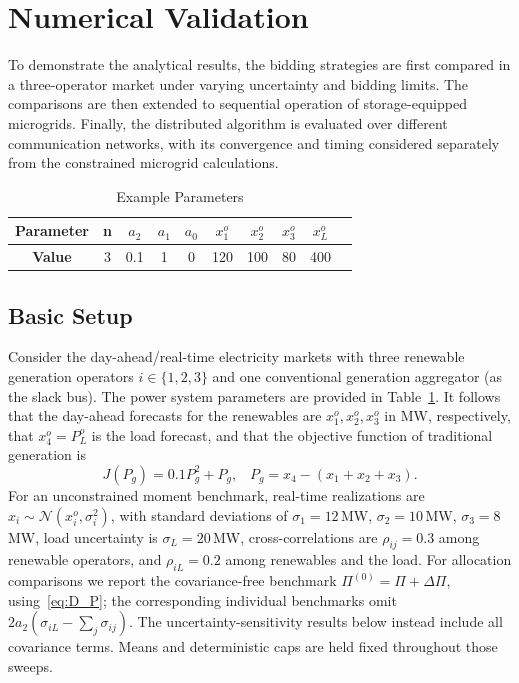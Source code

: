 \documentclass[journal]{IEEEtran}
\begin{document}
\section{Numerical Validation \label{sec:examples}}

To demonstrate the analytical results, the bidding strategies are first compared in a three-operator market under varying uncertainty and bidding limits. The comparisons are then extended to sequential operation of storage-equipped microgrids. Finally, the distributed algorithm is evaluated over different communication networks, with its convergence and timing considered separately from the constrained microgrid calculations.

\begin{table}[hbt!]
\centering
\vspace*{-0.1in}
\caption{Example Parameters}
\label{tab:example_params}
\begin{tabular}{|c||c||c|c|c||c|c|c||c|c|}
\hline
\textbf{Parameter} & n & $a_2$ & $a_1$ & $a_0$ & $x_1^o$ & $x_2^o$ & $x_3^o$ & $x_L^o$ \\ \hline
\textbf{Value} &  $3$ &  0.1 & 1 & 0 & 120 & 100 & 80 & 400 \\
\hline
\end{tabular}
\end{table}

\subsection{Basic Setup}

Consider the day-ahead/real-time electricity markets with three renewable generation operators $i \in \{1,2,3\}$ and one conventional generation aggregator (as the slack bus). The power system parameters are provided in Table~\ref{tab:example_params}. It follows that the day-ahead forecasts for the renewables are $x_1^o, x_2^o, x_3^o$ in MW, respectively, that $x_4^o = P_L^o$ is the load forecast, and that the objective function of traditional generation is 
\[
J(P_g) = 0.1P_g^2 + P_g, \;\;\; P_g=x_4-(x_1+x_2+x_3). 
\]
For an unconstrained moment benchmark, real-time realizations are $x_i \sim \mathcal{N}(x_i^o,\sigma_i^2)$, with standard deviations of $\sigma_1 = 12$\,MW, $\sigma_2 = 10$\,MW, $\sigma_3 = 8$\,MW, load uncertainty is $\sigma_L = 20$\,MW, cross-correlations are $\rho_{ij}=0.3$ among renewable operators, and $\rho_{iL}=0.2$ among renewables and the load. For allocation comparisons we report the covariance-free benchmark $\Pi^{(0)}=\Pi+\Delta\Pi$, using~\eqref{eq:D_P}; the corresponding individual benchmarks omit $2a_2(\sigma_{iL}-\sum_j\sigma_{ij})$. The uncertainty-sensitivity results below instead include all covariance terms. Means and deterministic caps are held fixed throughout those sweeps.
\end{document}
